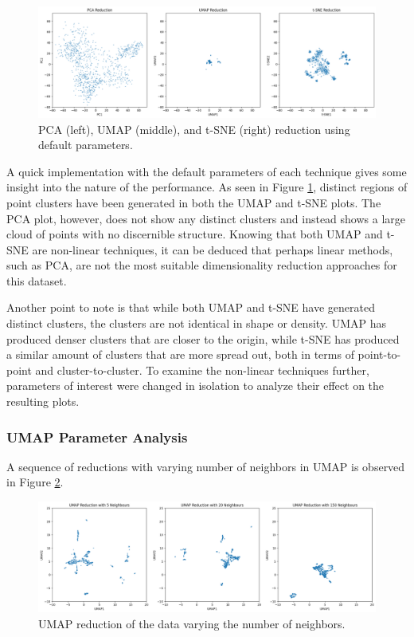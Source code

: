 \documentclass[12pt]{article}
\begin{document}
\begin{figure}[H]
    \centering
    \includegraphics[width=\textwidth]{Images/default_dimred.png}
    \caption{PCA (left), UMAP (middle), and t-SNE (right) reduction using default parameters.}
    \label{fig:default_dimred}
\end{figure}

A quick implementation with the default parameters of each technique gives some insight into the nature of the performance. As seen in Figure \ref{fig:default_dimred}, distinct regions of point clusters have been generated in both the UMAP and t-SNE plots. The PCA plot, however, does not show any distinct clusters and instead shows a large cloud of points with no discernible structure. Knowing that both UMAP and t-SNE are non-linear techniques, it can be deduced that perhaps linear methods, such as PCA, are not the most suitable dimensionality reduction approaches for this dataset.

Another point to note is that while both UMAP and t-SNE have generated distinct clusters, the clusters are not identical in shape or density. UMAP has produced denser clusters that are closer to the origin, while t-SNE has produced a similar amount of clusters that are more spread out, both in terms of point-to-point and cluster-to-cluster. To examine the non-linear techniques further, parameters of interest were changed in isolation to analyze their effect on the resulting plots. 

\subsubsection{UMAP Parameter Analysis}
A sequence of reductions with varying number of neighbors in UMAP is observed in Figure \ref{fig:UMAP_vary}.

\begin{figure}[H]
    \centering
    \includegraphics[width=\textwidth]{Images/UMAP_vary.png}
    \caption{UMAP reduction of the data varying the number of neighbors.}
    \label{fig:UMAP_vary}
\end{figure}
\end{document}
